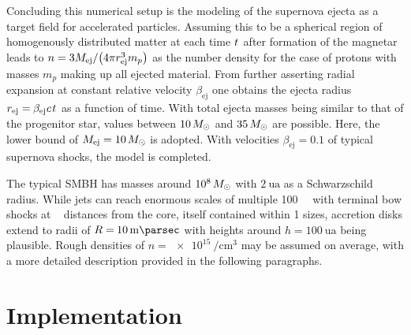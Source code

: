 \enlargethispage{\baselineskip}

Concluding this numerical setup is the modeling of the supernova ejecta as a target field for accelerated particles. Assuming
this to be a spherical region of homogenously distributed matter at each time $t \kern+0.5pt$ after formation of the magnetar
leads to $\cramped{n = 3 M_\text{ej} / \bigl( 4\pi r_\text{ej}^3 m_p \bigr)} \kern+0.5pt$ as the number density for the case of
protons with masses $m_p$ making up all ejected material. From further asserting radial expansion at constant relative velocity
$\beta_\text{ej}$ one obtains the ejecta radius $r_\text{ej} = \kern-0.4pt \beta_\text{ej} \kern+0.1pt c \kern+1.0pt t \kern+0.5pt$
as a function of time. With total ejecta masses being similar to that of the progenitor star, values between $\num{10} \kern+1.5pt M_\odot$
and $\num{35} \kern+1.5pt M_\odot$ are possible. Here, the lower bound of $\cramped{M_\text{ej} = \num{10} \kern+1.5pt M_\odot}$ is adopted.
With velocities $\beta_\text{ej} = \num{0.1}$ of typical supernova shocks, the model is completed.


The typical SMBH has masses around $\num{e8} \kern+1.5pt M_\odot$ with $\qty{2}{\astronomicalunit}$ as a Schwarzschild radius. While
jets can reach enormous scales of multiple \qty{100}{\kilo\parsec} with terminal bow shocks at \unit{\mega\parsec} distances from the
core, itself contained within \qty{1}{\parsec} sizes, accretion disks extend to radii of $R = \kern-0.5pt \qty{10}{\milli\parsec}$
with heights around $h = \qty{100}{\astronomicalunit}$ being plausible. Rough densities of $n = \qty{e15}{\per\centi\meter\cubed}$
may be assumed on average, with a more detailed description provided in the following paragraphs.


\section{Implementation}
\label{sec:implementation}

